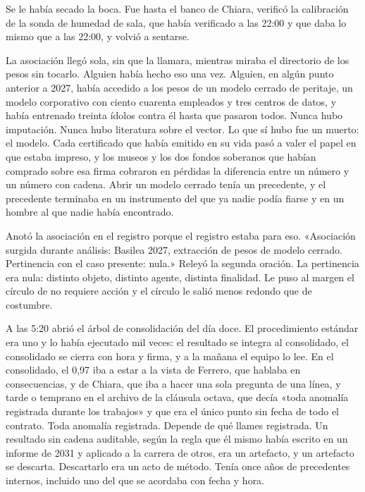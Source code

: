 Se le había secado la boca. Fue hasta el banco de Chiara, verificó la calibración de la sonda de humedad de sala, que había verificado a las 22:00 y que daba lo mismo que a las 22:00, y volvió a sentarse.

La asociación llegó sola, sin que la llamara, mientras miraba el directorio de los pesos sin tocarlo. Alguien había hecho eso una vez. Alguien, en algún punto anterior a 2027, había accedido a los pesos de un modelo cerrado de peritaje, un modelo corporativo con ciento cuarenta empleados y tres centros de datos, y había entrenado treinta ídolos contra él hasta que pasaron todos. Nunca hubo imputación. Nunca hubo literatura sobre el vector. Lo que sí hubo fue un muerto: el modelo. Cada certificado que había emitido en su vida pasó a valer el papel en que estaba impreso, y los museos y los dos fondos soberanos que habían comprado sobre esa firma cobraron en pérdidas la diferencia entre un número y un número con cadena. Abrir un modelo cerrado tenía un precedente, y el precedente terminaba en un instrumento del que ya nadie podía fiarse y en un hombre al que nadie había encontrado.

Anotó la asociación en el registro porque el registro estaba para eso. «Asociación surgida durante análisis: Basilea 2027, extracción de pesos de modelo cerrado. Pertinencia con el caso presente: nula.» Releyó la segunda oración. La pertinencia era nula: distinto objeto, distinto agente, distinta finalidad. Le puso al margen el círculo de no requiere acción y el círculo le salió menos redondo que de costumbre.

A las 5:20 abrió el árbol de consolidación del día doce. El procedimiento estándar era uno y lo había ejecutado mil veces: el resultado se integra al consolidado, el consolidado se cierra con hora y firma, y a la mañana el equipo lo lee. En el consolidado, el 0,97 iba a estar a la vista de Ferrero, que hablaba en consecuencias, y de Chiara, que iba a hacer una sola pregunta de una línea, y tarde o temprano en el archivo de la cláusula octava, que decía «toda anomalía registrada durante los trabajos» y que era el único punto sin fecha de todo el contrato. Toda anomalía registrada. Depende de qué llames registrada. Un resultado sin cadena auditable, según la regla que él mismo había escrito en un informe de 2031 y aplicado a la carrera de otros, era un artefacto, y un artefacto se descarta. Descartarlo era un acto de método. Tenía once años de precedentes internos, incluido uno del que se acordaba con fecha y hora.

